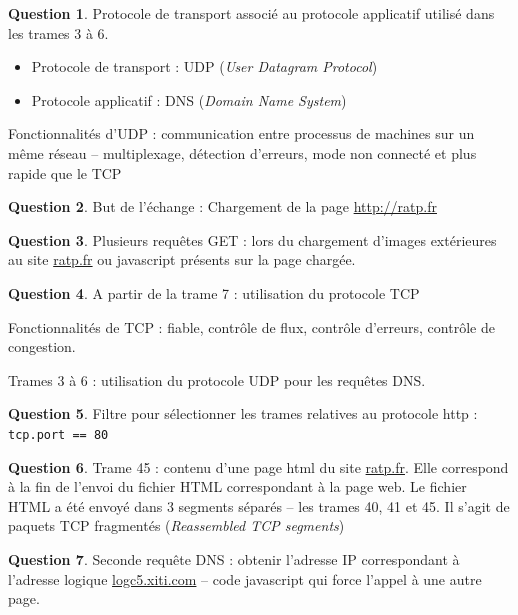 \documentclass[11pt,english,french]{scrreprt}
\theoremstyle{remark}
\theoremstyle{definition}
\newtheorem{ques}{Question}[section]
\begin{document}
\begin{ques}
	Protocole de transport associé au protocole applicatif utilisé dans les trames 3 à 6.\begin{itemize}
		\item Protocole de transport : UDP (\emph{User Datagram Protocol})
		\item Protocole applicatif : DNS (\emph{Domain Name System})
	\end{itemize}
	
	Fonctionnalités d'UDP : communication entre processus de machines sur un même réseau -- multiplexage, détection d'erreurs, mode non connecté et plus rapide que le TCP
\end{ques}

\begin{ques}
	But de l'échange : Chargement de la page \url{http://ratp.fr}
\end{ques}

\begin{ques}
	Plusieurs requêtes GET : lors du chargement d'images extérieures au site \url{ratp.fr} ou javascript présents sur la page chargée.
\end{ques}

\begin{ques}
	A partir de la trame 7 : utilisation du protocole TCP
	
	Fonctionnalités de TCP : fiable, contrôle de flux, contrôle d'erreurs, contrôle de congestion.
	
	Trames 3 à 6 : utilisation du protocole UDP pour les requêtes DNS.
\end{ques}

\begin{ques}
	Filtre pour sélectionner les trames relatives au protocole http : \lstinline!tcp.port == 80!
\end{ques}

\begin{ques}
	Trame 45 : contenu d'une page html du site \url{ratp.fr}. Elle correspond à la fin de l'envoi du fichier HTML correspondant à la page web.
	Le fichier HTML a été envoyé dans 3 segments séparés -- les trames 40, 41 et 45. Il s'agit de paquets TCP fragmentés (\emph{Reassembled TCP segments})
\end{ques}

\begin{ques}
	Seconde requête DNS : obtenir l'adresse IP correspondant à l'adresse logique \url{logc5.xiti.com} -- code javascript qui force l'appel à une autre page.
\end{ques}
\end{document}
